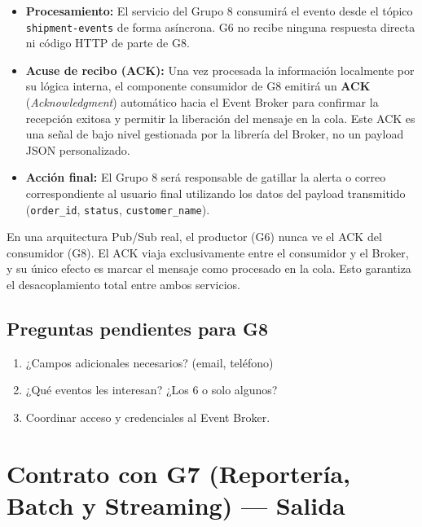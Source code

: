 \documentclass[11pt, a4paper]{article}
\begin{document}
\begin{itemize}[noitemsep]
  \item \textbf{Procesamiento:} El servicio del Grupo 8 consumirá el evento
    desde el tópico \texttt{shipment-events} de forma asíncrona. G6 no recibe
    ninguna respuesta directa ni código HTTP de parte de G8.
  \item \textbf{Acuse de recibo (ACK):} Una vez procesada la información
    localmente por su lógica interna, el componente consumidor de G8 emitirá un
    \textbf{ACK} (\textit{Acknowledgment}) automático hacia el Event Broker para
    confirmar la recepción exitosa y permitir la liberación del mensaje en la
    cola. Este ACK es una señal de bajo nivel gestionada por la librería del
    Broker, no un payload JSON personalizado.
  \item \textbf{Acción final:} El Grupo 8 será responsable de gatillar la
    alerta o correo correspondiente al usuario final utilizando los datos del
    payload transmitido (\texttt{order\_id}, \texttt{status},
    \texttt{customer\_name}).
\end{itemize}

\begin{infobox}
  En una arquitectura Pub/Sub real, el productor (G6) nunca ve el ACK del
  consumidor (G8). El ACK viaja exclusivamente entre el consumidor y el
  Broker, y su único efecto es marcar el mensaje como procesado en la cola.
  Esto garantiza el desacoplamiento total entre ambos servicios.
\end{infobox}

\subsection{Preguntas pendientes para G8}

\begin{warningbox}[title={\faExclamationCircle\quad Confirmar con G8}]
\begin{enumerate}[noitemsep]
  \item ¿Campos adicionales necesarios? (email, teléfono)
  \item ¿Qué eventos les interesan? ¿Los 6 o solo algunos?
  \item Coordinar acceso y credenciales al Event Broker.
\end{enumerate}
\end{warningbox}


\section{Contrato con G7 (Reportería, Batch y Streaming) --- Salida}
\end{document}
